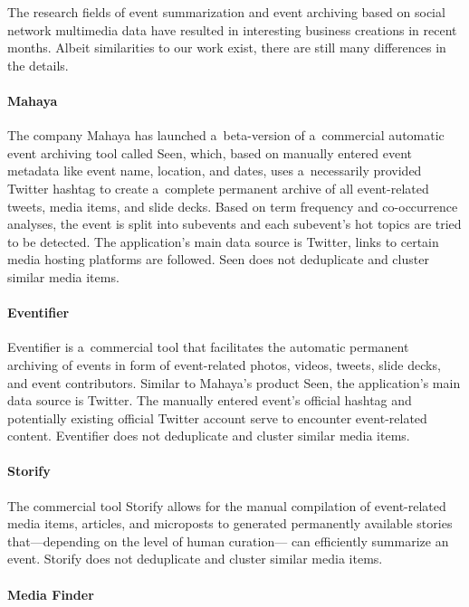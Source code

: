 The research fields of event summarization and event archiving
based on social network multimedia data have resulted in 
interesting business creations in recent months.
Albeit similarities to our work exist,
there are still many differences in the details.

\paragraph{Mahaya}
 
The company Mahaya has launched a~beta-version
of a~commercial automatic event archiving tool called Seen,
which, based on manually entered event metadata like event name,
location, and dates, uses a~necessarily provided Twitter hashtag
to create a~complete permanent archive of all event-related tweets,
media items, and slide decks.
Based on term frequency and co-occurrence analyses,
the event is split into subevents
and each subevent's hot topics are tried to be detected.
The application's main data source is Twitter,
links to certain media hosting platforms are followed.
Seen does not deduplicate and cluster
similar media items.

\paragraph{Eventifier}

Eventifier is a~commercial tool that facilitates the automatic permanent archiving of events
in form of event-related photos, videos, tweets, slide decks, 
and event contributors.
Similar to Mahaya's product Seen,
the application's main data source is Twitter.
The manually entered event's official hashtag and potentially existing
official Twitter account serve to encounter event-related content.
Eventifier does not deduplicate and cluster
similar media items.

\paragraph{Storify}

The commercial tool Storify allows for the manual compilation of
event-related media items, articles, and microposts
to generated permanently available stories
that---depending on the level of human curation---%
can efficiently summarize an event.
Storify does not deduplicate and cluster
similar media items.

\paragraph{Media Finder}

